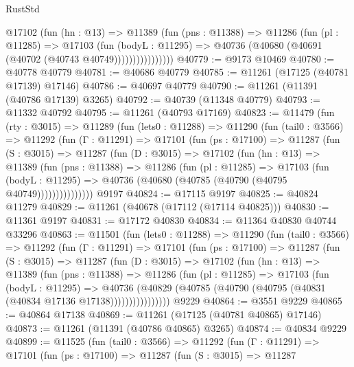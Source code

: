 \begin{lexlean}{RustStd}
\begin{coremodule}
                  @17102
                    (fun (hn : @13) =>
                    @11389
                      (fun (pns : @11388) =>
                      @11286
                        (fun (pl : @11285) =>
                        @17103
                          (fun (bodyL : @11295) =>
                          @40736 (@40680 (@40691 (@40702 (@40743 @40749))))))))))))))))
@40779 := @9173 @10469
@40780 := @40778 @40779
@40781 := @40686 @40779
@40785 := @11261 (@17125 (@40781 @17139) @17146)
@40786 := @40697 @40779
@40790 := @11261 (@11391 (@40786 @17139) @3265)
@40792 := @40739 (@11348 @40779)
@40793 := @11332 @40792
@40795 := @11261 (@40793 @17169)
@40823 := @11479
    (fun (rty : @3015) =>
    @11289
      (fun (lets0 : @11288) =>
      @11290
        (fun (tail0 : @3566) =>
        @11292
          (fun (Γ : @11291) =>
          @17101
            (fun (ps : @17100) =>
            @11287
              (fun (S : @3015) =>
              @11287
                (fun (D : @3015) =>
                @17102
                  (fun (hn : @13) =>
                  @11389
                    (fun (pns : @11388) =>
                    @11286
                      (fun (pl : @11285) =>
                      @17103
                        (fun (bodyL : @11295) =>
                        @40736 (@40680 (@40785 (@40790 (@40795 @40749)))))))))))))))
    @9197
@40824 := @17115 @9197
@40825 := @40824 @11279
@40829 := @11261 (@40678 (@17112 (@17114 @40825)))
@40830 := @11361 @9197
@40831 := @17172 @40830
@40834 := @11364 @40830 @40744 @33296
@40863 := @11501
    (fun (lets0 : @11288) =>
    @11290
      (fun (tail0 : @3566) =>
      @11292
        (fun (Γ : @11291) =>
        @17101
          (fun (ps : @17100) =>
          @11287
            (fun (S : @3015) =>
            @11287
              (fun (D : @3015) =>
              @17102
                (fun (hn : @13) =>
                @11389
                  (fun (pns : @11388) =>
                  @11286
                    (fun (pl : @11285) =>
                    @17103
                      (fun (bodyL : @11295) =>
                      @40736
                        (@40829
                          (@40785 (@40790 (@40795 (@40831 (@40834 @17136 @17138))))))))))))))))
    @9229
@40864 := @3551 @9229
@40865 := @40864 @17138
@40869 := @11261 (@17125 (@40781 @40865) @17146)
@40873 := @11261 (@11391 (@40786 @40865) @3265)
@40874 := @40834 @9229
@40899 := @11525
    (fun (tail0 : @3566) =>
    @11292
      (fun (Γ : @11291) =>
      @17101
        (fun (ps : @17100) =>
        @11287
          (fun (S : @3015) =>
          @11287

\end{coremodule}
\end{lexlean}
